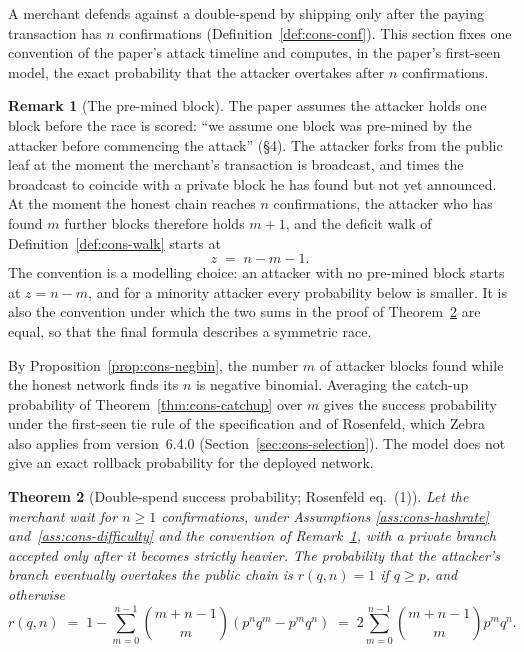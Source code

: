 \documentclass[11pt,a4paper]{article}
\newtheorem{theorem}{Theorem}[section]
\theoremstyle{definition}
\newtheorem{remark}[theorem]{Remark}
\begin{document}
A merchant defends against a double-spend by shipping only after the
paying transaction has $n$ confirmations (Definition~\ref{def:cons-conf}).
This section fixes one convention of the paper's attack timeline and
computes, in the paper's first-seen model, the exact probability that the
attacker overtakes after $n$ confirmations.

\begin{remark}[The pre-mined block]\label{rem:cons-premine}
The paper assumes the attacker holds one block before the race is
scored: ``we assume one block was pre-mined by the attacker before
commencing the attack'' (\S4). The attacker forks from the public leaf
at the moment the merchant's transaction is broadcast, and times the
broadcast to coincide with a private block he has found but not yet
announced. At the moment the honest chain reaches
$n$ confirmations, the attacker who has found $m$ further blocks
therefore holds $m + 1$, and the deficit walk of
Definition~\ref{def:cons-walk} starts at
\[
  z \;=\; n - m - 1.
\]
The convention is a modelling choice: an attacker with no pre-mined
block starts at $z = n - m$, and for a minority attacker every probability
below is smaller.
It is also the convention under which the two sums in the proof of
Theorem~\ref{thm:cons-r} are equal, so that the final formula describes
a symmetric race.
\end{remark}

By Proposition~\ref{prop:cons-negbin}, the number $m$ of attacker
blocks found while the honest network finds its $n$ is negative
binomial. Averaging the catch-up probability of
Theorem~\ref{thm:cons-catchup} over $m$ gives the success probability
under the first-seen tie rule of the specification and of Rosenfeld,
which Zebra also applies from version~6.4.0
(Section~\ref{sec:cons-selection}). The model does not give an exact
rollback probability for the deployed network.

\begin{theorem}[Double-spend success probability; Rosenfeld
eq.~(1)]\label{thm:cons-r}
Let the merchant wait for $n \geq 1$ confirmations, under
Assumptions \ref{ass:cons-hashrate} and~\ref{ass:cons-difficulty} and
the convention of Remark~\ref{rem:cons-premine}, with a private branch
accepted only after it becomes strictly heavier. The probability that
the attacker's branch eventually overtakes the public chain is
$r(q, n) = 1$ if $q \geq p$, and otherwise
\begin{equation}\label{eq:cons-r}
  r(q, n)
  \;=\; 1 - \sum_{m=0}^{n-1} \binom{m+n-1}{m}
        \left( p^n q^m - p^m q^n \right)
  \;=\; 2 \sum_{m=0}^{n-1} \binom{m+n-1}{m} p^m q^n .
\end{equation}
\end{theorem}
\end{document}

